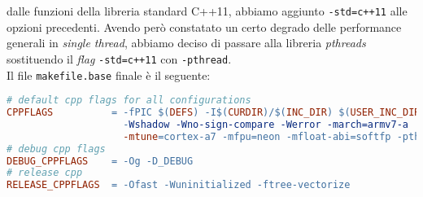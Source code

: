 dalle funzioni della libreria standard C++11, abbiamo aggiunto 
\verb|-std=c++11| alle opzioni precedenti.
Avendo però constatato un certo degrado delle performance generali in 
\emph{single thread}, abbiamo deciso di passare alla libreria \emph{pthreads} 
sostituendo il \emph{flag} \verb|-std=c++11| con \verb|-pthread|.\\
Il file \verb|makefile.base| finale è il seguente:\\
\begin{lstlisting}[language=make]
# default cpp flags for all configurations
CPPFLAGS          = -fPIC $(DEFS) -I$(CURDIR)/$(INC_DIR) $(USER_INC_DIRS) -Wall 
                    -Wshadow -Wno-sign-compare -Werror -march=armv7-a 
                    -mtune=cortex-a7 -mfpu=neon -mfloat-abi=softfp -pthread
# debug cpp flags
DEBUG_CPPFLAGS    = -Og -D_DEBUG
# release cpp
RELEASE_CPPFLAGS  = -Ofast -Wuninitialized -ftree-vectorize
\end{lstlisting}

